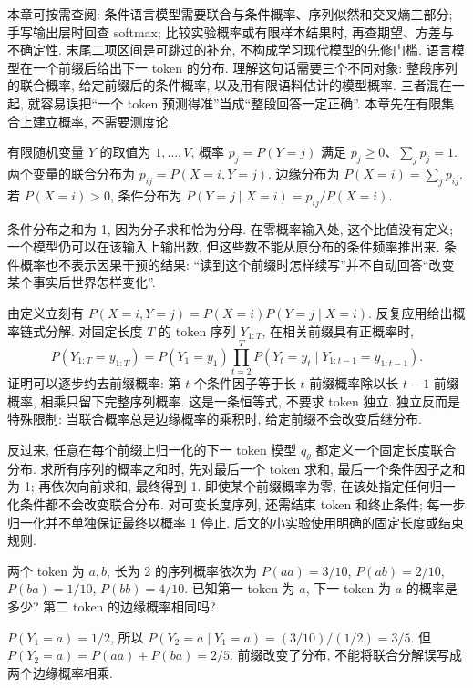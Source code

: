 \label{ch:prob}
本章可按需查阅: 条件语言模型需要联合与条件概率、序列似然和交叉熵三部分; 手写输出层时回查 softmax; 比较实验概率或有限样本结果时, 再查期望、方差与不确定性. 末尾二项区间是可跳过的补充, 不构成学习现代模型的先修门槛.
语言模型在一个前缀后给出下一 token 的分布. 理解这句话需要三个不同对象: 整段序列的联合概率, 给定前缀后的条件概率, 以及用有限语料估计的模型概率. 三者混在一起, 就容易误把“一个 token 预测得准”当成“整段回答一定正确”. 本章先在有限集合上建立概率, 不需要测度论.

\begin{definition}
有限随机变量 $Y$ 的取值为 $1,\ldots,V$, 概率 $p_j=P(Y=j)$ 满足 $p_j\ge0$、$\sum_jp_j=1$. 两个变量的联合分布为 $p_{ij}=P(X=i,Y=j)$. 边缘分布为 $P(X=i)=\sum_jp_{ij}$. 若 $P(X=i)>0$, 条件分布为
$P(Y=j\mid X=i)=p_{ij}/P(X=i)$.
\end{definition}
条件分布之和为 1, 因为分子求和恰为分母. 在零概率输入处, 这个比值没有定义; 一个模型仍可以在该输入上输出数, 但这些数不能从原分布的条件频率推出来. 条件概率也不表示因果干预的结果: “读到这个前缀时怎样续写”并不自动回答“改变某个事实后世界怎样变化”.

由定义立刻有 $P(X=i,Y=j)=P(X=i)P(Y=j\mid X=i)$. 反复应用给出概率链式分解. 对固定长度 $T$ 的 token 序列 $Y_{1:T}$, 在相关前缀具有正概率时,
\[
P(Y_{1:T}=y_{1:T})=P(Y_1=y_1)\prod_{t=2}^TP(Y_t=y_t\mid Y_{1:t-1}=y_{1:t-1}).
\]
证明可以逐步约去前缀概率: 第 $t$ 个条件因子等于长 $t$ 前缀概率除以长 $t-1$ 前缀概率, 相乘只留下完整序列概率. 这是一条恒等式, 不要求 token 独立. 独立反而是特殊限制: 当联合概率总是边缘概率的乘积时, 给定前缀不会改变后继分布.

反过来, 任意在每个前缀上归一化的下一 token 模型 $q_\theta$ 都定义一个固定长度联合分布. 求所有序列的概率之和时, 先对最后一个 token 求和, 最后一个条件因子之和为 1; 再依次向前求和, 最终得到 1. 即使某个前缀概率为零, 在该处指定任何归一化条件都不会改变联合分布. 对可变长度序列, 还需结束 token 和终止条件; 每一步归一化并不单独保证最终以概率 1 停止. 后文的小实验使用明确的固定长度或结束规则.

\begin{example}
两个 token 为 $a,b$, 长为 2 的序列概率依次为 $P(aa)=3/10$, $P(ab)=2/10$, $P(ba)=1/10$, $P(bb)=4/10$. 已知第一 token 为 $a$, 下一 token 为 $a$ 的概率是多少? 第二 token 的边缘概率相同吗?
\end{example}
\begin{solution}
$P(Y_1=a)=1/2$, 所以 $P(Y_2=a\mid Y_1=a)=(3/10)/(1/2)=3/5$. 但 $P(Y_2=a)=P(aa)+P(ba)=2/5$. 前缀改变了分布, 不能将联合分解误写成两个边缘概率相乘.
\end{solution}

